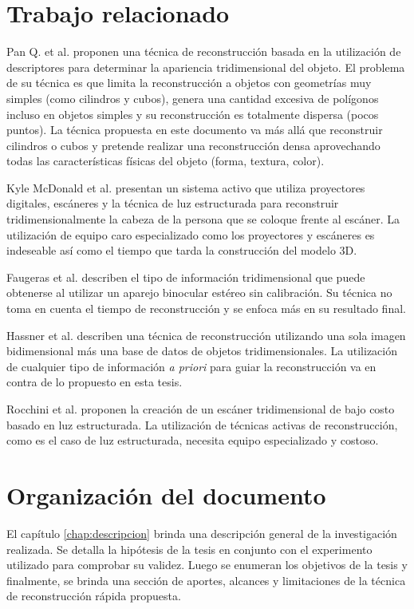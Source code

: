 \section{Trabajo relacionado}
Pan Q. et al. \cite{pan2009ProFORMA} proponen una t\'{e}cnica de reconstrucci\'{o}n basada en la utilizaci\'{o}n de descriptores para determinar la apariencia tridimensional del objeto. El problema de su t\'{e}cnica es que limita la reconstrucci\'{o}n a objetos con geometr\'{i}as muy simples (como cilindros y cubos), genera una cantidad excesiva de pol\'{i}gonos incluso en objetos simples y su reconstrucci\'{o}n es totalmente dispersa (pocos puntos). La t\'{e}cnica propuesta en este documento va m\'{a}s all\'{a} que reconstruir cilindros o cubos y pretende realizar una reconstrucci\'{o}n densa aprovechando todas las caracter\'{i}sticas f\'{i}sicas del objeto (forma, textura, color).

Kyle McDonald et al. \cite{wiki:Janus_machine} presentan un sistema activo que utiliza proyectores digitales, esc\'{a}neres y la t\'{e}cnica de luz estructurada para reconstruir tridimensionalmente la cabeza de la persona que se coloque frente al esc\'{a}ner. La utilizaci\'{o}n de equipo caro especializado como los proyectores y esc\'{a}neres es indeseable as\'{i} como el tiempo que tarda la construcci\'{o}n del modelo 3D.

Faugeras et al. \cite{Faugeras_1992} describen el tipo de informaci\'{o}n tridimensional que puede obtenerse al utilizar un aparejo binocular est\'{e}reo sin calibraci\'{o}n. Su t\'{e}cnica no toma en cuenta el tiempo de reconstrucci\'{o}n y se enfoca m\'{a}s en su resultado final.

Hassner et al. \cite{Hassner_Basri_2006} describen una t\'{e}cnica de reconstrucci\'{o}n utilizando una sola imagen bidimensional m\'{a}s una base de datos de objetos tridimensionales. La utilizaci\'{o}n de cualquier tipo de informaci\'{o}n \textit{a priori} para guiar la reconstrucci\'{o}n va en contra de lo propuesto en esta tesis.

Rocchini et al. \cite{Rocchini_Cignoni_Montani_Pingi_Scopigno_2001} proponen la creación de un esc\'{a}ner tridimensional de bajo costo basado en luz estructurada. La utilizaci\'{o}n de t\'{e}cnicas activas de reconstrucci\'{o}n, como es el caso de luz estructurada, necesita equipo especializado y costoso.


\section{Organizaci\'{o}n del documento}
El cap\'{i}tulo \ref{chap:descripcion} brinda una descripci\'{o}n general de la investigaci\'{o}n realizada. Se detalla la hip\'{o}tesis de la tesis en conjunto con el experimento utilizado para comprobar su validez. Luego se enumeran los objetivos de la tesis y finalmente, se brinda una secci\'{o}n de aportes, alcances y limitaciones de la t\'{e}cnica de reconstrucci\'{o}n r\'{a}pida propuesta.

